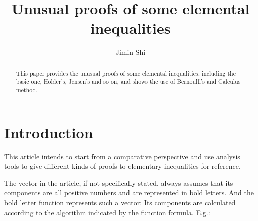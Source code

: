 \documentclass[12pt,a4paper,reqno]{amsart}
\theoremstyle{plain}
\theoremstyle{definition}
\begin{document}
\title{Unusual proofs of some elemental inequalities}


\author{Jimin Shi}
\address{Shanxi Normail University \\ Department of Mathematics \\
\\ Linfen, Shanxi 041000 \\ P. R. China} 









\begin{abstract} This paper provides the unusual proofs of some elemental inequalities, including the basic one, H\"older's, Jensen's and so on, and shows the use of Bernoulli's and Calculus method.
\end{abstract}

\maketitle

\section{Introduction} 
This article intends to start from a comparative perspective and use analysis tools to give different kinds of proofs to elementary inequalities for reference.

The vector in the article, if not specifically stated, always assumes that its components are all positive numbers and are represented in bold letters. And the bold letter function represents such a vector: Its components are calculated according to the algorithm indicated by the function formula. E.g.: 
\end{document}
